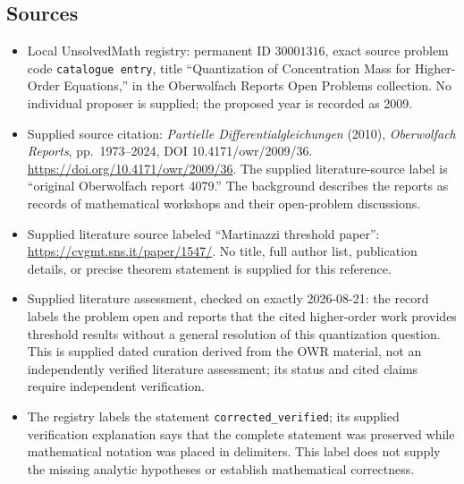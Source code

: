 \documentclass[11pt]{article}
\begin{document}
\subsection{Sources}
\begin{itemize}
\item Local UnsolvedMath registry: permanent ID \(30001316\), exact source problem code \texttt{catalogue entry}, title ``Quantization of Concentration Mass for Higher-Order Equations,'' in the Oberwolfach Reports Open Problems collection. No individual proposer is supplied; the proposed year is recorded as 2009.
\item Supplied source citation: \emph{Partielle Differentialgleichungen} (2010), \emph{Oberwolfach Reports}, pp.\ 1973--2024, DOI 10.4171/owr/2009/36. \url{https://doi.org/10.4171/owr/2009/36}. The supplied literature-source label is ``original Oberwolfach report 4079.'' The background describes the reports as records of mathematical workshops and their open-problem discussions.
\item Supplied literature source labeled ``Martinazzi threshold paper'': \url{https://cvgmt.sns.it/paper/1547/}. No title, full author list, publication details, or precise theorem statement is supplied for this reference.
\item Supplied literature assessment, checked on exactly 2026-08-21: the record labels the problem open and reports that the cited higher-order work provides threshold results without a general resolution of this quantization question. This is supplied dated curation derived from the OWR material, not an independently verified literature assessment; its status and cited claims require independent verification.
\item The registry labels the statement \texttt{corrected\_verified}; its supplied verification explanation says that the complete statement was preserved while mathematical notation was placed in delimiters. This label does not supply the missing analytic hypotheses or establish mathematical correctness.
\end{itemize}
\end{document}
